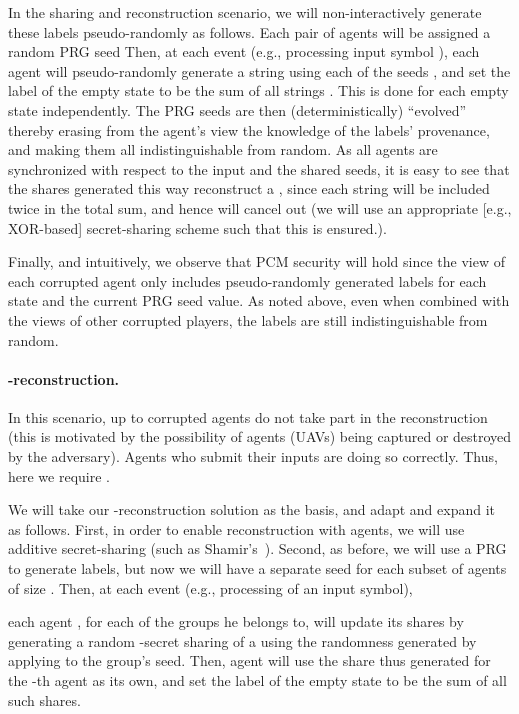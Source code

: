 \documentclass[letterpaper,11pt]{article}
\newcommand{\ignore}[1]{}
               {}
\begin{document}
In the  sharing and reconstruction scenario, we will non-interactively
generate these labels pseudo-randomly as follows.  Each pair of
agents  will be assigned a random PRG seed  
Then, at each event (e.g., processing input symbol
), each agent  will pseudo-randomly generate a string
 using each of the seeds , and set the label of the
empty state to be the sum of all strings . 
This is done for each empty state independently.  The PRG
seeds are then (deterministically) ``evolved'' thereby erasing from the
agent's view the knowledge of the labels' provenance, and making them all
indistinguishable from random.  As all agents are synchronized with
respect to the input and the shared seeds, it is easy to see that the
shares generated this way reconstruct a , since each string  will be
included twice in the total sum, and hence will cancel out (we will use an
appropriate [e.g., XOR-based] secret-sharing scheme such that 
this is ensured.).


Finally, and intuitively, we observe that  PCM security
will hold since
the view of each corrupted agent only includes pseudo-randomly
generated labels for each state and the current PRG seed value.  As noted
above, even when combined with the views of other corrupted players, the labels
are still indistinguishable from random.

\vspace{-.1in}
\paragraph{-reconstruction.} In this scenario, up to  corrupted 
agents do not take part in the reconstruction (this is motivated by the
possibility of agents (UAVs) being captured or destroyed by the
adversary).  Agents who submit their inputs are doing so correctly.
Thus, here we require .

We will take our -reconstruction solution as the basis, and
adapt and expand it as follows.  First, in order to enable
reconstruction with  agents, we will use  additive
secret-sharing (such as Shamir's~\cite{Sha79}).  Second, as before,
we will use a PRG to generate labels, but now we will have a
separate seed for each subset of agents of size .  Then, at each
event (e.g., processing of an input symbol),
\ignore{
 
\textcolor{blue}{\todo{Lena: clock cycle with or without input letter}
VLAD: We need to agree on the detail how we schedule inputs. I think
it should be at most one input per clock cycle, right.  We should
write and justify it in the model section above.},
}
each agent ,
for each of the groups he belongs to, will update its shares by
generating a random -secret sharing of a  using the randomness generated by applying 
to the group's seed.  Then, agent  will use the share thus generated for
the -th agent as its own,
and set the label of the empty state to be the sum of all such shares.
\end{document}
